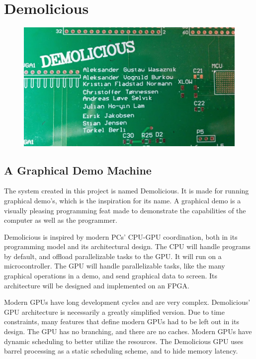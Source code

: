 \documentclass[../main/report.tex]{subfiles}
\begin{document}
\chapter{Demolicious}
\label{sec:demolicious}



\begin{figure}[htp]
\centering
\includegraphics[scale=0.24]{assets/PCP_logo.jpg}
\end{figure}

\section{A Graphical Demo Machine}
\label{sec:demolicious-demo-machine}

The system created in this project is named Demolicious.
It is made for running graphical demo's, which is the inspiration for its name.
A graphical demo is a visually pleasing programming feat made to demonstrate the capabilities of the computer as well as the programmer.

Demolicious is inspired by modern PCs' CPU-GPU coordination, both in its programming model and its architectural design.
The CPU will handle programs by default, and offload parallelizable tasks to the GPU.
It will run on a microcontroller.
The GPU will handle parallelizable tasks, like the many graphical operations in a demo, and send graphical data to screen.
Its architecture will be designed and implemented on an FPGA.

Modern GPUs have long development cycles and are very complex.
Demolicious' GPU architecture is necessarily a greatly simplified version.
Due to time constraints, many features that define modern GPUs had to be left out in its design.
The GPU has no branching, and there are no caches.
Modern GPUs have dynamic scheduling to better utilize the resources.
The Demolicious GPU uses barrel processing as a static scheduling scheme, and to hide memory latency.
\end{document}

